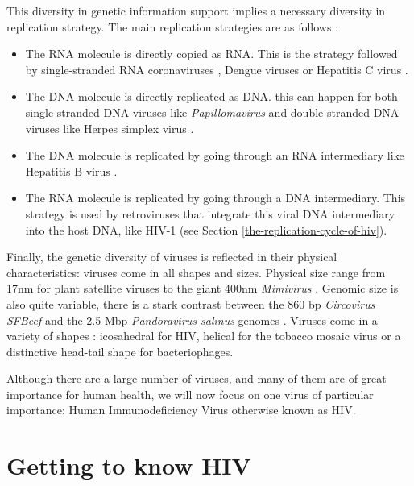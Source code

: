\documentclass[
  11pt,
  twoside,
  BCOR=10mm,
  listof=totoc]{scrbook}
\begin{document}
This diversity in genetic information support implies a necessary diversity in replication strategy. The main replication strategies are as follows \autocite{domingoVirusEvolution2014}:

\begin{itemize}
\item
  The RNA molecule is directly copied as RNA. This is the strategy followed by single-stranded RNA coronaviruses \autocite{vkovskiCoronavirusBiologyReplication2021}, Dengue viruses \autocite{backDengueVirusesOverview2013} or Hepatitis C virus \autocite{dustinHepatitisVirusLife2016}.
\item
  The DNA molecule is directly replicated as DNA. this can happen for both single-stranded DNA viruses like \emph{Papillomavirus} \autocite{kadajaPapillomavirusDNAReplication2009}and double-stranded DNA viruses like Herpes simplex virus \autocite{wellerHerpesSimplexViruses2012}.
\item
  The DNA molecule is replicated by going through an RNA intermediary like Hepatitis B virus \autocite{beckHepatitisVirusReplication2007}.
\item
  The RNA molecule is replicated by going through a DNA intermediary. This strategy is used by retroviruses that integrate this viral DNA intermediary into the host DNA, like HIV-1 (see Section \ref{the-replication-cycle-of-hiv}).
\end{itemize}

Finally, the genetic diversity of viruses is reflected in their physical characteristics: viruses come in all shapes and sizes. Physical size range from 17nm for plant satellite viruses \autocite{pyleChapter58Biology2017} to the giant 400nm \emph{Mimivirus} \autocite{raoult2megabaseGenomeSequence2004}. Genomic size is also quite variable, there is a stark contrast between the 860 bp \emph{Circovirus SFBeef} and the 2.5 Mbp \emph{Pandoravirus salinus} genomes \autocite{campillo-balderasViralGenomeSize2015}. Viruses come in a variety of shapes \autocite{cannVirusStructure2015}: icosahedral for HIV, helical for the tobacco mosaic virus or a distinctive head-tail shape for bacteriophages.

Although there are a large number of viruses, and many of them are of great importance for human health, we will now focus on one virus of particular importance: Human Immunodeficiency Virus otherwise known as HIV.

\hypertarget{getting-to-know-hiv}{%
\section{Getting to know HIV}\label{getting-to-know-hiv}}
\end{document}
